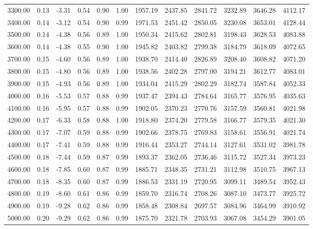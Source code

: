 \begin{table}[ht]
\begin{tabular}{rrrrrrrrrrrr}
  3300.00 & 0.13 & -3.31 & 0.54 & 0.90 & 1.00 & 1957.19 & 2437.85 & 2841.72 & 3232.89 & 3646.28 & 4112.17 \\ 
  3400.00 & 0.14 & -3.12 & 0.54 & 0.90 & 0.99 & 1971.53 & 2451.42 & 2850.05 & 3230.08 & 3653.01 & 4128.44 \\ 
  3500.00 & 0.14 & -4.38 & 0.56 & 0.89 & 1.00 & 1950.34 & 2415.62 & 2802.81 & 3198.43 & 3628.53 & 4083.88 \\ 
  3600.00 & 0.14 & -4.38 & 0.55 & 0.90 & 1.00 & 1945.82 & 2403.82 & 2799.38 & 3184.79 & 3618.09 & 4072.65 \\ 
  3700.00 & 0.15 & -4.60 & 0.56 & 0.89 & 1.00 & 1938.70 & 2414.40 & 2826.89 & 3208.40 & 3608.82 & 4071.20 \\ 
  3800.00 & 0.15 & -4.80 & 0.56 & 0.89 & 1.00 & 1938.56 & 2402.28 & 2797.00 & 3194.21 & 3612.77 & 4083.01 \\ 
  3900.00 & 0.15 & -4.93 & 0.56 & 0.89 & 1.00 & 1934.04 & 2415.29 & 2802.29 & 3182.74 & 3587.84 & 4052.33 \\ 
  4000.00 & 0.16 & -5.53 & 0.57 & 0.88 & 0.99 & 1937.47 & 2394.43 & 2784.64 & 3165.77 & 3576.95 & 4035.63 \\ 
  4100.00 & 0.16 & -5.95 & 0.57 & 0.88 & 0.99 & 1902.05 & 2370.23 & 2770.76 & 3157.59 & 3560.81 & 4021.98 \\ 
  4200.00 & 0.17 & -6.33 & 0.58 & 0.88 & 1.00 & 1918.80 & 2374.20 & 2779.58 & 3166.77 & 3579.35 & 4021.30 \\ 
  4300.00 & 0.17 & -7.07 & 0.59 & 0.88 & 0.99 & 1902.66 & 2378.75 & 2769.83 & 3158.61 & 3556.91 & 4021.74 \\ 
  4400.00 & 0.17 & -7.41 & 0.59 & 0.88 & 0.99 & 1916.44 & 2353.27 & 2744.14 & 3127.61 & 3531.02 & 3981.78 \\ 
  4500.00 & 0.18 & -7.44 & 0.59 & 0.87 & 0.99 & 1893.37 & 2362.05 & 2736.46 & 3115.72 & 3527.34 & 3973.23 \\ 
  4600.00 & 0.18 & -7.85 & 0.60 & 0.87 & 0.99 & 1885.71 & 2348.35 & 2731.21 & 3112.98 & 3510.75 & 3967.13 \\ 
  4700.00 & 0.18 & -8.35 & 0.60 & 0.87 & 0.99 & 1886.53 & 2331.19 & 2720.95 & 3099.11 & 3489.54 & 3952.43 \\ 
  4800.00 & 0.19 & -8.60 & 0.61 & 0.86 & 0.99 & 1859.70 & 2316.74 & 2708.26 & 3087.10 & 3473.77 & 3925.72 \\ 
  4900.00 & 0.19 & -9.28 & 0.62 & 0.86 & 0.99 & 1858.48 & 2308.84 & 2697.57 & 3084.96 & 3464.99 & 3910.92 \\ 
  5000.00 & 0.20 & -9.29 & 0.62 & 0.86 & 0.99 & 1875.70 & 2321.78 & 2703.93 & 3067.08 & 3454.29 & 3901.05 \\ 

\end{tabular}
\end{table}
